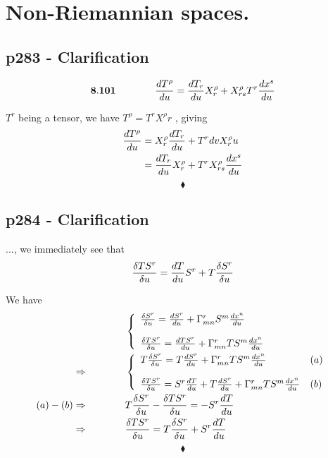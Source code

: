\setcounter{chapter}{7}
\chapter{Non-Riemannian spaces.}
\pagebreak[4]
\section{p283 - Clarification}
\begin{tcolorbox}
$$\mathbf{8.101}\quad\quad\quad\quad \dv{T^{\rho}}{u} =\dv{T_r}{u}X^{\rho}_{r} + X^{\rho}_{rs}T^r \dv{x^s}{u}$$
\end{tcolorbox}
$T^r$ being a tensor, we have $ T^{\rho} = T^r X^{\rho}{r}$
, giving
\begin{align*}
\dv{T^{\rho}}{u} &= X^{\rho}_{r}\dv{T_r}{u} + T^r dv{X^{\rho}_{r}}{u}\\
&= \dv{T_r}{u}X^{\rho}_{r} + T^r X^{\rho}_{rs}\dv{x^s}{u}
\end{align*}
$$\blacklozenge$$
\newpage

\section{p284 - Clarification}
\begin{tcolorbox}
..., we immediately see that
$$\fdv{TS^r}{u} = \dv{T}{u} S^r + T \fdv{S^r}{u}$$
\end{tcolorbox}
We have 
\begin{align*}
&\left\{\begin{array}{ll}
\fdv{S^r}{u} = \dv{S^r}{u} +\Gamma^r_{mn}S^m\dv{x^n}{u}& \ \\\\
\fdv{TS^r}{u} = \dv{TS^r}{u} +\Gamma^r_{mn}TS^m\dv{x^n}{u}& \ \\
\end{array}\right.\\
\Rightarrow \spatie &\left\{\begin{array}{ll}
T\fdv{S^r}{u} = T\dv{S^r}{u} +\Gamma^r_{mn}TS^m\dv{x^n}{u}&(a)\\\\
\fdv{TS^r}{u} = S^r\dv{T}{u} + T\dv{S^r}{u} +\Gamma^r_{mn}TS^m\dv{x^n}{u}&(b)\\
\end{array}\right.\\
(a)-(b)\Rightarrow\spatie & T \fdv{S^r}{u} - \fdv{TS^r}{u} =-  S^r\dv{T}{u} \\
\Rightarrow\spatie &\fdv{TS^r}{u} = T\fdv{S^r}{u}  +  S^r\dv{T}{u} 
\end{align*}
$$\blacklozenge$$
\newpage

